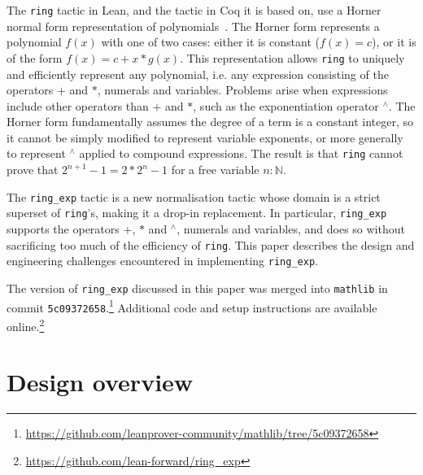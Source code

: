 \documentclass{llncs}
\newcommand{\Q}{\mathbb{Q}}
\newcommand{\lean}[1]{\texttt{#1}\xspace} %
\newcommand{\mathlib}{\texttt{mathlib}\xspace}
\newcommand{\pow}{{${}^\wedge$}\xspace}
\newcommand{\ring}{\lean{ring}}
\newcommand{\ringexp}{\lean{ring\_exp}}
\begin{document}
The \ring tactic in Lean, and the tactic in Coq it is based on,
use a Horner normal form representation of polynomials~\cite{ring-tactic}.
The Horner form represents a polynomial $f(x)$ with one of two cases:
either it is constant ($f(x) = c$), or it is of the form $f(x) = c + x * g(x)$.
This representation
allows \ring to uniquely and efficiently represent any polynomial,
i.e. any expression consisting of the operators $+$ and $*$, numerals and variables.
Problems arise when expressions include other operators than $+$ and $*$, such as the exponentiation operator \pow.
The Horner form fundamentally assumes the degree of a term is a constant integer,
so it cannot be simply modified to represent variable exponents,
or more generally to represent \pow applied to compound expressions.
The result is that \ring cannot prove that $2^{n+1} - 1 = 2 * 2^n - 1$ for a free variable $n : \mathbb{N}$.

The \ringexp tactic is a new normalisation tactic whose domain is a strict superset of \ring's,
making it a drop-in replacement. %
In particular, \ringexp supports the operators $+$, $*$ and \pow, numerals and variables,
and does so without sacrificing too much of the efficiency of \ring.
This paper describes the design and engineering challenges encountered in implementing \ringexp.

The version of \ringexp discussed in this paper was merged into \mathlib in commit \texttt{5c09372658}.\footnote{\url{https://github.com/leanprover-community/mathlib/tree/5c09372658}}
Additional code and setup instructions are available online.\footnote{\url{https://github.com/lean-forward/ring_exp}}

\section{Design overview}
\end{document}
